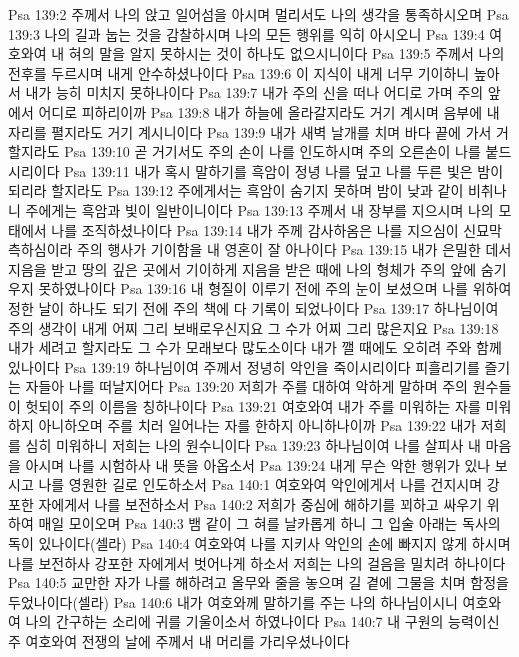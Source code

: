 Psa 139:2  주께서 나의 앉고 일어섬을 아시며 멀리서도 나의 생각을 통족하시오며
Psa 139:3  나의 길과 눕는 것을 감찰하시며 나의 모든 행위를 익히 아시오니
Psa 139:4  여호와여 내 혀의 말을 알지 못하시는 것이 하나도 없으시니이다
Psa 139:5  주께서 나의 전후를 두르시며 내게 안수하셨나이다
Psa 139:6  이 지식이 내게 너무 기이하니 높아서 내가 능히 미치지 못하나이다
Psa 139:7  내가 주의 신을 떠나 어디로 가며 주의 앞에서 어디로 피하리이까
Psa 139:8  내가 하늘에 올라갈지라도 거기 계시며 음부에 내 자리를 펼지라도 거기 계시니이다
Psa 139:9  내가 새벽 날개를 치며 바다 끝에 가서 거할지라도
Psa 139:10  곧 거기서도 주의 손이 나를 인도하시며 주의 오른손이 나를 붙드시리이다
Psa 139:11  내가 혹시 말하기를 흑암이 정녕 나를 덮고 나를 두른 빛은 밤이 되리라 할지라도
Psa 139:12  주에게서는 흑암이 숨기지 못하며 밤이 낮과 같이 비취나니 주에게는 흑암과 빛이 일반이니이다
Psa 139:13  주께서 내 장부를 지으시며 나의 모태에서 나를 조직하셨나이다
Psa 139:14  내가 주께 감사하옴은 나를 지으심이 신묘막측하심이라 주의 행사가 기이함을 내 영혼이 잘 아나이다
Psa 139:15  내가 은밀한 데서 지음을 받고 땅의 깊은 곳에서 기이하게 지음을 받은 때에 나의 형체가 주의 앞에 숨기우지 못하였나이다
Psa 139:16  내 형질이 이루기 전에 주의 눈이 보셨으며 나를 위하여 정한 날이 하나도 되기 전에 주의 책에 다 기록이 되었나이다
Psa 139:17  하나님이여 주의 생각이 내게 어찌 그리 보배로우신지요 그 수가 어찌 그리 많은지요
Psa 139:18  내가 세려고 할지라도 그 수가 모래보다 많도소이다 내가 깰 때에도 오히려 주와 함께 있나이다
Psa 139:19  하나님이여 주께서 정녕히 악인을 죽이시리이다 피흘리기를 즐기는 자들아 나를 떠날지어다
Psa 139:20  저희가 주를 대하여 악하게 말하며 주의 원수들이 헛되이 주의 이름을 칭하나이다
Psa 139:21  여호와여 내가 주를 미워하는 자를 미워하지 아니하오며 주를 치러 일어나는 자를 한하지 아니하나이까
Psa 139:22  내가 저희를 심히 미워하니 저희는 나의 원수니이다
Psa 139:23  하나님이여 나를 살피사 내 마음을 아시며 나를 시험하사 내 뜻을 아옵소서
Psa 139:24  내게 무슨 악한 행위가 있나 보시고 나를 영원한 길로 인도하소서
Psa 140:1  여호와여 악인에게서 나를 건지시며 강포한 자에게서 나를 보전하소서
Psa 140:2  저희가 중심에 해하기를 꾀하고 싸우기 위하여 매일 모이오며
Psa 140:3  뱀 같이 그 혀를 날카롭게 하니 그 입술 아래는 독사의 독이 있나이다(셀라)
Psa 140:4  여호와여 나를 지키사 악인의 손에 빠지지 않게 하시며 나를 보전하사 강포한 자에게서 벗어나게 하소서 저희는 나의 걸음을 밀치려 하나이다
Psa 140:5  교만한 자가 나를 해하려고 올무와 줄을 놓으며 길 곁에 그물을 치며 함정을 두었나이다(셀라)
Psa 140:6  내가 여호와께 말하기를 주는 나의 하나님이시니 여호와여 나의 간구하는 소리에 귀를 기울이소서 하였나이다
Psa 140:7  내 구원의 능력이신 주 여호와여 전쟁의 날에 주께서 내 머리를 가리우셨나이다
